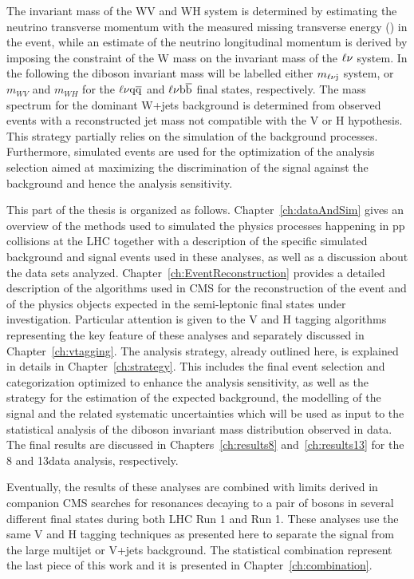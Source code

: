 The invariant mass of the WV and WH system is determined by estimating the neutrino transverse momentum with the measured missing transverse energy
(\ETmiss) in the event, while an estimate of the neutrino longitudinal momentum is derived by imposing the constraint of the W mass on the invariant mass of the $\ell\nu$ system.
In the following the diboson invariant mass will be labelled either $m_{\ell\nu\mathrm{j}}$ system, or $m_{WV}$ and $m_{WH}$ for the $\ell\nu\mathrm{q}\overline{\mathrm{q}}$ and $\ell\nu{\mathrm{b}\overline{\mathrm{b}}}$ final states, respectively.
The mass spectrum for the dominant W+jets background is determined from observed events with a reconstructed jet mass not compatible with the V or H hypothesis. 
This strategy partially relies on the simulation of the background processes.
Furthermore, simulated events are used for the optimization of the analysis selection aimed at maximizing the discrimination of the signal against the background and hence the analysis sensitivity.

This part of the thesis is organized as follows.
Chapter~\ref{ch:dataAndSim} gives an overview of the methods used to simulated the physics processes happening in pp collisions at the LHC
together with a description of the specific simulated background and signal events used in these analyses, as well as a discussion about the data sets analyzed.
Chapter~\ref{ch:EventReconstruction} provides a detailed description of the algorithms used in CMS for the reconstruction of the event and of the physics objects expected in the semi-leptonic final states under investigation.
Particular attention is given to the V and H tagging algorithms representing the key feature of these analyses and separately discussed in Chapter~\ref{ch:vtagging}.
The analysis strategy, already outlined here, is explained in details in Chapter~\ref{ch:strategy}.
This includes the final event selection and categorization optimized to enhance the analysis sensitivity,
as well as the strategy for the estimation of the expected background, the modelling of the signal and the related systematic uncertainties
which will be used as input to the statistical analysis of the diboson invariant mass distribution observed in data.
The final results are discussed in Chapters~\ref{ch:results8} and~\ref{ch:results13} for the 8 and 13\TeV data analysis, respectively. 

Eventually, the results of these analyses are combined with limits derived in companion CMS searches for resonances decaying to a pair of bosons in several different final states during both LHC Run 1 and Run 1.
These analyses use the same V and H tagging techniques as presented here to separate the signal from the large multijet or V+jets background.
The statistical combination represent the last piece of this work and it is presented in Chapter~\ref{ch:combination}.